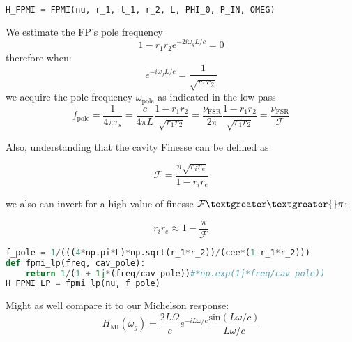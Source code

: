 \begin{spacing}{1.2} \begin{lstlisting}[frame=single, language=Python]
H_FPMI = FPMI(nu, r_1, t_1, r_2, L, PHI_0, P_IN, OMEG)
\end{lstlisting} \end{spacing}

\noindent We estimate the FP's pole frequency
\begin{equation}  1 - r_1 r_2 e^{-2i \omega_g L / c} = 0 \end{equation} therefore when:
\begin{equation} e^{-i \omega_g L / c} = \frac{1}{\sqrt{r_1 r_2}} \end{equation} we acquire the
pole frequency \(\omega_\mathrm{pole}\) as indicated in the low pass
\begin{equation} f_\mathrm{pole} = \frac{1}{4\pi \tau_{s}} =  \frac{c}{4 \pi L} \frac{1- r_1 r_2}{\sqrt{r_1 r_2}} = \frac{\nu_\mathrm{FSR}}{2 \pi} \frac{1- r_1 r_2}{\sqrt{r_1 r_2}} = \frac{\nu_\mathrm{FSR}}{\mathcal{F}} \end{equation}

\noindent Also, understanding that the cavity Finesse can be defined as

\begin{equation} \mathcal{F} = \frac{\pi \sqrt{r_i r_e}}{1- r_i r_e} \end{equation}

\noindent we also can invert for a high value of finesse $ \mathcal{F} \textgreater\textgreater{} \pi $:

\begin{equation} r_i r_e \approx 1 - \frac{\pi}{\mathcal{F}} \end{equation}

\begin{spacing}{1.2} \begin{lstlisting}[frame=single, language=Python]
f_pole = 1/(((4*np.pi*L)*np.sqrt(r_1*r_2))/(cee*(1-r_1*r_2)))
def fpmi_lp(freq, cav_pole):
    return 1/(1 + 1j*(freq/cav_pole))#*np.exp(1j*freq/cav_pole))
H_FPMI_LP = fpmi_lp(nu, f_pole)
\end{lstlisting} \end{spacing}

\noindent Might as well compare it to our Michelson response:
\begin{equation} H_{\mathrm{MI}}(\omega_g) = \frac{2 L \Omega}{c}e^{-i L \omega / c} \frac{\mathrm{sin}(L \omega /c)}{L \omega /c} \end{equation}

